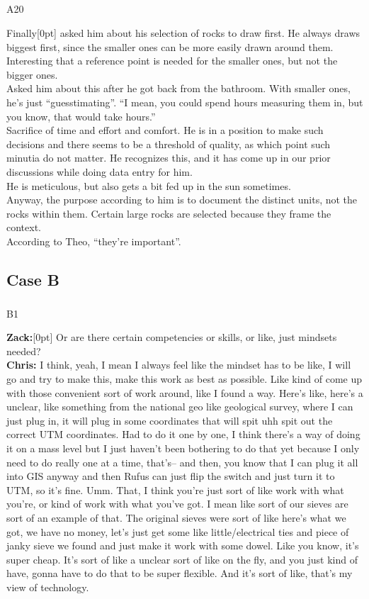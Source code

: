 \documentclass[
]{article}
\makeatletter
\let\oldsubparagraph\subparagraph
\renewcommand{\subparagraph}{
    \@ifstar
      \xxxSubParagraphStar
      \xxxSubParagraphNoStar
  }
\newcommand{\xxxSubParagraphStar}[1]{\oldsubparagraph*{#1}\mbox{}}
\newcommand{\xxxSubParagraphNoStar}[1]{\oldsubparagraph{#1}\mbox{}}
\newcommand{\paragraphnumber}[1]{\marginnote{\color{lightgray}\tiny{#1}}[0pt]}
\makeatother
\begin{document}
\subparagraph{A20}\label{sec-A20}

Finally\paragraphnumber{[114]} asked him about his selection of rocks to
draw first. He always draws biggest first, since the smaller ones can be
more easily drawn around them.\\
Interesting that a reference point is needed for the smaller ones, but
not the bigger ones.\\
Asked him about this after he got back from the bathroom. With smaller
ones, he's just ``guesstimating''. ``I mean, you could spend hours
measuring them in, but you know, that would take hours.''\\
Sacrifice of time and effort and comfort. He is in a position to make
such decisions and there seems to be a threshold of quality, as which
point such minutia do not matter. He recognizes this, and it has come up
in our prior discussions while doing data entry for him.\\
He is meticulous, but also gets a bit fed up in the sun sometimes.\\
Anyway, the purpose according to him is to document the distinct units,
not the rocks within them. Certain large rocks are selected because they
frame the context.\\
According to Theo, ``they're important''.

\subsection{Case B}\label{case-b}

\subparagraph{B1}\label{sec-B1}

\textbf{Zack:}\paragraphnumber{[115]} Or are there certain competencies
or skills, or like, just mindsets needed?\\
\textbf{Chris:} I think, yeah, I mean I always feel like the mindset has
to be like, I will go and try to make this, make this work as best as
possible. Like kind of come up with those convenient sort of work
around, like I found a way. Here's like, here's a unclear, like
something from the national geo like geological survey, where I can just
plug in, it will plug in some coordinates that will spit uhh spit out
the correct UTM coordinates. Had to do it one by one, I think there's a
way of doing it on a mass level but I just haven't been bothering to do
that yet because I only need to do really one at a time, that's-- and
then, you know that I can plug it all into GIS anyway and then Rufus can
just flip the switch and just turn it to UTM, so it's fine. Umm. That, I
think you're just sort of like work with what you're, or kind of work
with what you've got. I mean like sort of our sieves are sort of an
example of that. The original sieves were sort of like here's what we
got, we have no money, let's just get some like little/electrical ties
and piece of janky sieve we found and just make it work with some dowel.
Like you know, it's super cheap. It's sort of like a unclear sort of
like on the fly, and you just kind of have, gonna have to do that to be
super flexible. And it's sort of like, that's my view of technology.
\end{document}
